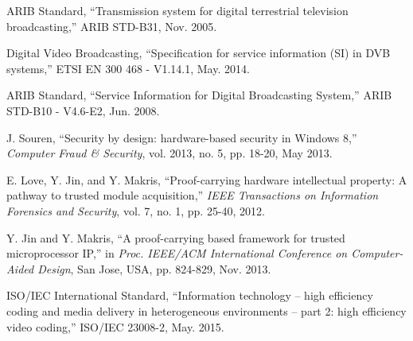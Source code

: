 \begin{thebibliography}{}
ARIB Standard, ``Transmission system for digital terrestrial television broadcasting,'' ARIB STD-B31, Nov. 2005.

Digital Video Broadcasting, ``Specification for service information (SI) in DVB systems,'' ETSI EN 300 468  - V1.14.1, May. 2014.

ARIB Standard, ``Service Information for Digital Broadcasting System,'' ARIB STD-B10 -  V4.6-E2, Jun. 2008.

J. Souren, ``Security by design: hardware-based security in Windows 8,'' \emph{Computer Fraud \& Security}, vol. 2013, no. 5, pp. 18-20, May 2013.

E. Love, Y. Jin, and Y. Makris, ``Proof-carrying hardware intellectual property: A pathway to trusted module acquisition,'' \emph{IEEE Transactions on Information Forensics and Security}, vol. 7, no. 1, pp. 25-40, 2012.

Y. Jin and Y. Makris, ``A proof-carrying based framework for trusted microprocessor IP,'' in \emph{Proc. IEEE/ACM International Conference on Computer-Aided Design}, San Jose, USA, pp. 824-829, Nov. 2013.

ISO/IEC International Standard, ``Information technology -- high efficiency coding and media delivery in heterogeneous environments -- part 2: high efficiency video coding,'' ISO/IEC 23008-2, May. 2015.




\end{thebibliography}




